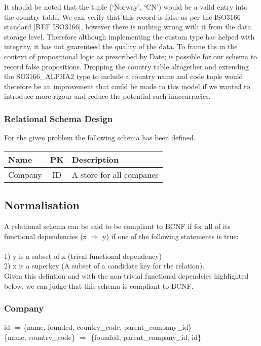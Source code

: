 \documentclass[12pt]{article}
\begin{document}
It should be noted that the tuple (`Norway', `CN') would be a valid entry into the country table. We can verify that this record is false as per the ISO3166 standard [REF ISO3166], however there is nothing wrong with it from the data storage level. Therefore although implementing the custom type has helped with integrity, it has not guarenteed the quality of the data. To frame ths in the context of propositional logic as prescribed by Date; is possible for our schema to record false propositions. Dropping the country table altogether and extending the SO3166\_ALPHA2 type to include a country name and code tuple would therefore be an improvement that could be made to this model if we wanted to introduce more rigour and reduce the potential such inaccurracies.

\subsubsection{Relational Schema Design}
For the given problem the following schema has been defined. \\

\begin{tabular}{l|c|l}
Name&PK&Description\\\hline
Company&ID&A store for all companes\\
\end{tabular}

\subsection{Normalisation}
A relational schema can be said to be compliant to BCNF if for all of its functional dependencies (x $\Rightarrow$ y) if one of the following statements is true: \\\\
1) y is a subset of x (trival functional dependency) \\
2) x is a superkey (A subset of a candidate key for the relation). \\
Given this defintion and with the non-trivial functional dependcies highlighted below, we can judge that this schema is compliant to BCNF.

\subsubsection{Company}

id $\Rightarrow${\{name, founded, country\_code, parent\_company\_id\}} \\
\{{name, country\_code\}} $\Rightarrow$ {\{founded, parent\_company\_id, id\}} \\
\end{document}
